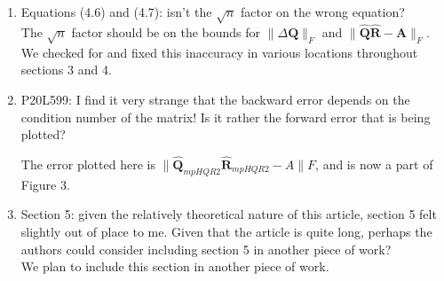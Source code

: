 \documentclass[10pt]{article}
\newcommand{\bb}[1]{\mathbf{#1}}
\begin{document}
\begin{enumerate}
{	}
	\item Equations (4.6) and (4.7): isn't the $\sqrt{n}$ factor on the wrong equation?\\
	{\normalfont
		The $\sqrt{n}$ factor should be on the bounds for $\|\Delta\bb{Q}\|_F$ and $\|\hat{\bb{Q}}\hat{\bb{R}}-\bb{A}\|_F$.
		We checked for and fixed this inaccuracy in various locations throughout sections 3 and 4. 
	}
%		
%		
	\item P20L599: I find it very strange that the backward error depends on the condition number of the matrix! Is it rather the forward error that is being plotted?\\
	{\normalfont The error plotted here is $\|\hat{\bb{Q}}_{mpHQR2}\hat{\bb{R}}_{mpHQR2}-A\|F$, and is now a part of Figure 3.
	
	}
	\item Section 5: given the relatively theoretical nature of this article, section 5 felt slightly out of place to me. Given that the article is quite long, perhaps the authors could consider including section 5 in another piece of work? \\
	{\normalfont We plan to include this section in another piece of work.}
	
\end{enumerate}


\end{document}
